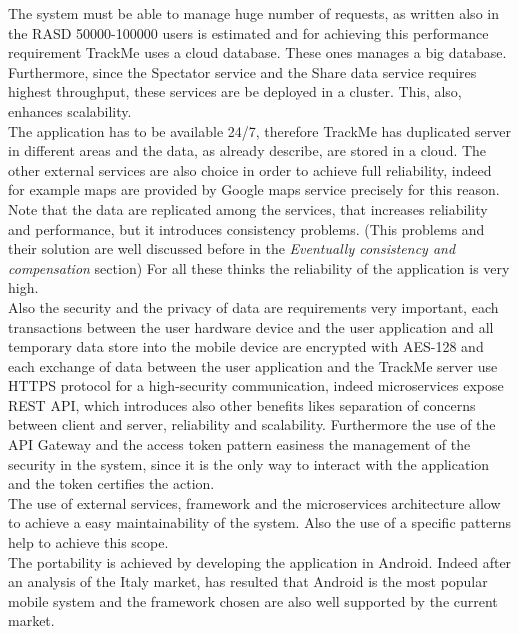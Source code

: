 The system must be able to manage huge number of requests, as written also in the RASD 50000-100000 users is estimated and for achieving this performance requirement TrackMe uses a cloud database. These ones manages a big database. Furthermore, since the Spectator service and the Share data service requires highest throughput, these services are be deployed in a cluster. This, also, enhances scalability.\\ The application has to be available 24/7, therefore TrackMe has duplicated server in different areas and the data, as already describe, are stored in a cloud. The other external services are also choice in order to achieve full reliability, indeed for example maps are provided by Google maps service precisely for this reason. Note that the data are replicated among the services, that increases reliability and performance, but it introduces consistency problems. (This problems and their solution are well discussed before in the \textit{Eventually consistency and compensation } section) For all these thinks the reliability of the application is very high.\\ Also the security and the privacy of data are requirements very important, each transactions between the user hardware device and the user application and all temporary data store into the mobile device are encrypted with AES-128 and each exchange of data between the user application and the TrackMe server use HTTPS protocol for a high-security communication, indeed microservices expose REST API, which introduces also other benefits likes separation of concerns between client and server, reliability and scalability. Furthermore the use of the API Gateway and the access token pattern easiness the management of the security in the system, since it is the only way to interact with the application and the token certifies the action.\\ The use of external services, framework and the microservices architecture allow to achieve a easy maintainability of the system. Also the use of a specific patterns help to achieve this scope.\\
The portability is achieved by developing the application in Android. Indeed after an analysis of the Italy market, has resulted that Android is the most popular mobile system and the framework chosen are also well supported by the current market.
